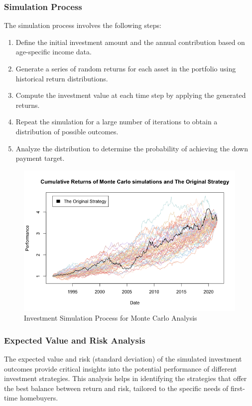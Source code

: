 \subsubsection{Simulation Process}
The simulation process involves the following steps:
\begin{enumerate}
    \item Define the initial investment amount and the annual contribution based on age-specific income data.
    \item Generate a series of random returns for each asset in the portfolio using historical return distributions.
    \item Compute the investment value at each time step by applying the generated returns.
    \item Repeat the simulation for a large number of iterations to obtain a distribution of possible outcomes.
    \item Analyze the distribution to determine the probability of achieving the down payment target.
\end{enumerate}

\begin{figure}[h]
\centering
\includegraphics[width=\linewidth]{investment_simulation_process.png}
\caption{Investment Simulation Process for Monte Carlo Analysis}
\label{fig:simulation_process}
\end{figure}

\subsubsection{Expected Value and Risk Analysis}
The expected value and risk (standard deviation) of the simulated investment outcomes provide critical insights into the potential performance of different investment strategies. This analysis helps in identifying the strategies that offer the best balance between return and risk, tailored to the specific needs of first-time homebuyers.
